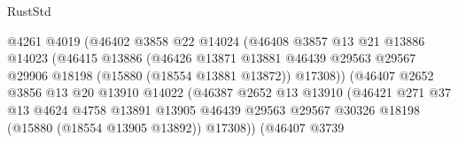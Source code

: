 \begin{lexlean}{RustStd}
\begin{coremodule}
                                    @4261
                                    @4019
                                    (@46402
                                      @3858
                                      @22
                                      @14024
                                      (@46408
                                        @3857
                                        @13
                                        @21
                                        @13886
                                        @14023
                                        (@46415
                                          @13886
                                          (@46426
                                            @13871
                                            @13881
                                            @46439
                                            @29563
                                            @29567
                                            @29906
                                            @18198
                                            (@15880 (@18554 @13881 @13872))
                                            @17308))
                                        (@46407
                                          @2652
                                          @3856
                                          @13
                                          @20
                                          @13910
                                          @14022
                                          (@46387
                                            @2652
                                            @13
                                            @13910
                                            (@46421
                                              @271
                                              @37
                                              @13
                                              @4624
                                              @4758
                                              @13891
                                              @13905
                                              @46439
                                              @29563
                                              @29567
                                              @30326
                                              @18198
                                              (@15880 (@18554 @13905 @13892))
                                              @17308))
                                          (@46407
                                            @3739

\end{coremodule}
\end{lexlean}
